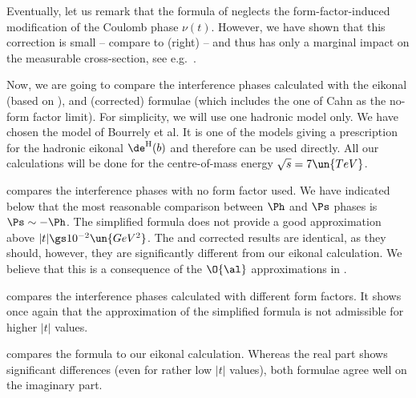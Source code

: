 Eventually, let us remark that the formula of \KaL{} neglects the form-factor-induced modification of the Coulomb phase $\nu(t)$. However, we have shown that this correction is small -- compare  to  (right) -- and thus has only a marginal impact on the measurable cross-section, see e.g.~.



Now, we are going to compare the interference phases calculated with the eikonal (based on ), \WY{} and (corrected) \KL{} formulae (which includes the one of Cahn as the no-form factor limit). For simplicity, we will use one hadronic model only. We have chosen the model of Bourrely et al. It is one of the models giving a prescription for the hadronic eikonal $\de^{\rm H}(b)$ and therefore  can be used directly. All our calculations will be done for the centre-of-mass energy $\sqrt s = 7\un{TeV}$.

 compares the interference phases with no form factor used. We have indicated below  that the most reasonable comparison between $\Ph$ and $\Ps$ phases is $\Ps \sim - \Ph$. The simplified \WY{} formula does not provide a good approximation above $|t| \gs 10^{-2}\un{GeV^2}$. The \WY{} and corrected \KL{} results are identical, as they should, however, they are significantly different from our eikonal calculation. We believe that this is a consequence of the $\O{\al}$ approximations in .

 compares the interference phases calculated with different form factors. It shows once again that the approximation of the simplified \WaY{} formula is not admissible for higher $|t|$ values.

 compares the \KL{} formula to our eikonal calculation. Whereas the real part shows significant differences (even for rather low $|t|$ values), both formulae agree well on the imaginary part.




